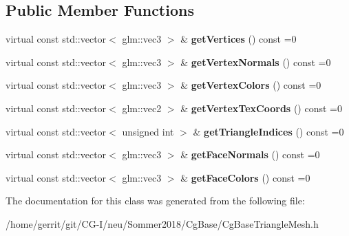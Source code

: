 \subsection*{Public Member Functions}
\begin{DoxyCompactItemize}
\item 
\mbox{\label{class_cg_base_triangle_mesh_a2610c9cb38db919ca04865858ba6d130}} 
virtual const std\+::vector$<$ glm\+::vec3 $>$ \& {\bfseries get\+Vertices} () const =0
\item 
\mbox{\label{class_cg_base_triangle_mesh_a0ccd53e3069bb22e2d8632e9af078a13}} 
virtual const std\+::vector$<$ glm\+::vec3 $>$ \& {\bfseries get\+Vertex\+Normals} () const =0
\item 
\mbox{\label{class_cg_base_triangle_mesh_ada6b6fafcdb58d83637d7ee8b2d7d0c5}} 
virtual const std\+::vector$<$ glm\+::vec3 $>$ \& {\bfseries get\+Vertex\+Colors} () const =0
\item 
\mbox{\label{class_cg_base_triangle_mesh_a9aa23102d80d49f1df727fe7aac48765}} 
virtual const std\+::vector$<$ glm\+::vec2 $>$ \& {\bfseries get\+Vertex\+Tex\+Coords} () const =0
\item 
\mbox{\label{class_cg_base_triangle_mesh_a6443d6eee38ca487b253791b72797e89}} 
virtual const std\+::vector$<$ unsigned int $>$ \& {\bfseries get\+Triangle\+Indices} () const =0
\item 
\mbox{\label{class_cg_base_triangle_mesh_a6c885702ddcc74d15ee0006ed7699462}} 
virtual const std\+::vector$<$ glm\+::vec3 $>$ \& {\bfseries get\+Face\+Normals} () const =0
\item 
\mbox{\label{class_cg_base_triangle_mesh_af60df0e2e48b043a2d3d527d1a81136e}} 
virtual const std\+::vector$<$ glm\+::vec3 $>$ \& {\bfseries get\+Face\+Colors} () const =0
\end{DoxyCompactItemize}


The documentation for this class was generated from the following file\+:\begin{DoxyCompactItemize}
\item 
/home/gerrit/git/\+C\+G-\/\+I/neu/\+Sommer2018/\+Cg\+Base/Cg\+Base\+Triangle\+Mesh.\+h\end{DoxyCompactItemize}
